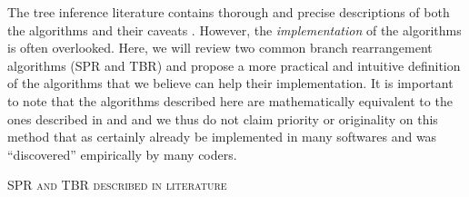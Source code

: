 \documentclass[12pt,letterpaper]{article}
\renewcommand{\section}[1]{%
\bigskip
\begin{center}
\begin{Large}
\normalfont\scshape #1
\medskip
\end{Large}
\end{center}}
\renewcommand{\subsection}[1]{%
\bigskip
\begin{center}
\begin{large}
\normalfont\itshape #1
\end{large}
\end{center}}
\begin{document}
The tree inference literature contains thorough and precise descriptions of both the algorithms \citep[e.g.][]{allen2001subtree,felsenstein2004inferring} and their caveats \citep[i.e speed and reliability - e.g.][]{morrison2007increasing,lakner2008efficiency,goloboff2014bias}.
However, the \textit{implementation} of the algorithms is often overlooked.
Here, we will review two common branch rearrangement algorithms (SPR and TBR) and propose a more practical and intuitive definition of the algorithms that we believe can help their implementation.
It is important to note that the algorithms described here are mathematically equivalent to the ones described in \cite{allen2001subtree} and \cite{felsenstein2004inferring} and we thus do not claim priority or originality on this method that as certainly already be implemented in many softwares and was ``discovered'' empirically by many coders.

\section{SPR and TBR described in literature}


\end{document}
